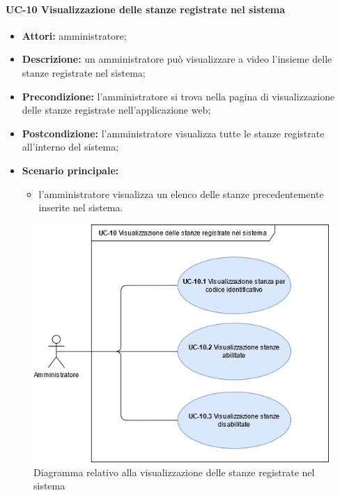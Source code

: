
\paragraph{UC-10 Visualizzazione delle stanze registrate nel sistema}
\begin{itemize}
    \item \textbf{Attori:} amministratore;
    \item \textbf{Descrizione:} un amministratore pu\`{o} visualizzare a video l'insieme delle stanze registrate nel sistema;
    \item \textbf{Precondizione:} l'amministratore si trova nella pagina di visualizzazione delle stanze registrate nell'applicazione web;
    \item \textbf{Postcondizione:} l'amministratore visualizza tutte le stanze registrate all'interno del sistema;
    \item \textbf{Scenario principale:}
    \begin{itemize}
        \item l'amministratore visualizza un elenco delle stanze precedentemente inserite nel sistema.
    \end{itemize}
\end{itemize}

\begin{figure}[H]
    \centering
      \includegraphics[scale=0.50]{src/CasiDUso/immagini/VisualizzazioneStanzeRegistrate.png}
    \caption{Diagramma relativo alla visualizzazione delle stanze registrate nel sistema}
\end{figure}


